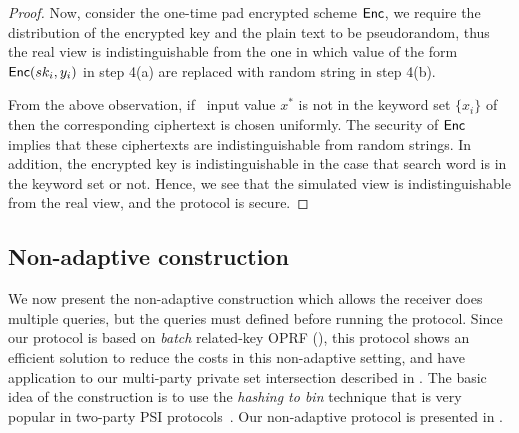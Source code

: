 \begin{proof}
	Now, consider the one-time pad encrypted scheme $\mathsf{Enc}$,  we require the distribution of the encrypted key and the plain text to be pseudorandom, thus the real view is indistinguishable from the one in which value of the form  $\mathsf{Enc}(sk_i, y_i)$ in step 4(a) are replaced with random string in step 4(b). 
	
	From the above observation, if \RR\ input value $x^*$ is not in the keyword set $\{x_i\}$ of \SS\, then the corresponding ciphertext is chosen uniformly. The security of $\mathsf{Enc}$ implies that these ciphertexts are indistinguishable from random strings. In addition, the encrypted key is indistinguishable in the case that search word is in the keyword set or not.  Hence, we see that the simulated view is indistinguishable from the real view, and the protocol is secure.
\end{proof}

\subsection{Non-adaptive \OPPRF construction}
\label{sect:constrnSSOT}
We now present the non-adaptive \OPPRF construction which allows the receiver does multiple \OPPRF queries, but the queries must defined before running the protocol. Since our \OPPRF protocol is based on \textit{batch} related-key OPRF (\batchOPRF), this protocol shows an efficient solution to reduce the costs in this non-adaptive setting, and have application to our multi-party private set intersection described in . The basic idea of the construction is to use the \textit{hashing to bin} technique that is very popular in two-party PSI protocols~\cite{DBLP:conf/uss/Pinkas0SZ15,DBLP:conf/uss/Pinkas0Z14}. Our  non-adaptive \OPPRF protocol is presented in . 


